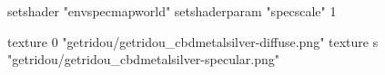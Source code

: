 setshader "envspecmapworld"
setshaderparam "specscale" 1

texture 0 "getridou/getridou_cbdmetalsilver-diffuse.png"
texture s "getridou/getridou_cbdmetalsilver-specular.png"

